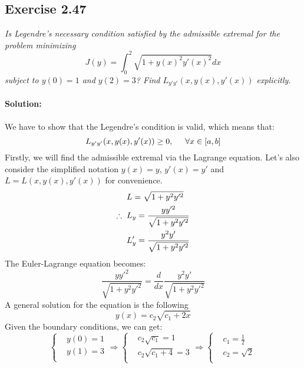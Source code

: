 \subsection{Exercise 2.47}
\emph{Is Legendre's necessary condition satisfied by the admissible extremal for the problem minimizing}
\begin{equation}
    J(y) = \int_0^2 \sqrt{1 + y(x)^2 y'(x)^2} dx
\end{equation}
\emph{subject to $y(0) = 1$ and $y(2) = 3$? Find $L_{y'y'}(x,y(x),y'(x))$ explicitly.}\\
\\
\textbf{Solution:}\\
\\
We have to show that the Legendre's condition is valid, which means that:
\begin{equation}
    L_{y'y'}(x, y(x), y'(x)) \geq 0, \hspace{0.5cm} \forall x \in [a, b]
\end{equation}
Firstly, we will find the admissible extremal via the Lagrange equation. Let's also consider the simplified notation $y(x) = y$, $y'(x) = y'$ and $L = L(x, y(x), y'(x))$ for convenience.\
\begin{align}
    & L = \sqrt{1+y^2y'^2} \\
    \therefore \hspace{0.2cm} &L_y = \frac{yy'^2}{\sqrt{1+y^2 y'^2}} \\
    &L_y' = \frac{y^2 y'}{\sqrt{1+y^2 y'^2}} \\
\end{align}
The Euler-Lagrange equation becomes:
\begin{equation}
    \frac{yy'^2}{\sqrt{1+y^2 y'^2}} = \frac{d}{dx} \frac{y^2 y'}{\sqrt{1+y^2 y'^2}}
\end{equation}
A general solution for the equation is the following
\begin{equation}
    y(x) = c_2 \sqrt{c_1 +2x}
\end{equation}
Given the boundary conditions, we can get:
\begin{equation}
    \begin{cases}
    &y(0) = 1 \\
    &y(1) = 3 \\
    \end{cases}
    \Longrightarrow
    \begin{cases}
    &c_2\sqrt{c_1} = 1 \\
    &c_2\sqrt{c_1 + 4} = 3 \\
    \end{cases}
    \Longrightarrow
    \begin{cases}
    &c_1 = \frac{1}{2}\\
    &c_2 = \sqrt{2}\\
    \end{cases}
\end{equation}

